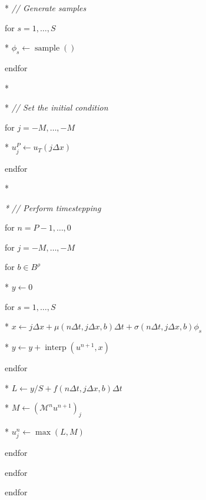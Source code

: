 \documentclass[12pt]{article}
\begin{document}
\medskip{}

{\footnotesize

\begin{multicols}{2}
\begin{algor}[1]
\item [{{*}}] \emph{// Generate samples}
\item [{for}] $s=1,\ldots,S$
\begin{algor}[1]
\item [{{*}}] $\phi_{s}\gets\operatorname{sample}()$
\end{algor}
\item [{endfor}]~
\item [{{*}}]~
\item [{{*}}] \emph{// Set the initial condition}
\item [{for}] $j=-M,\ldots,-M$
\begin{algor}[1]
\item [{{*}}] $u_{j}^{P}\gets u_{T}(j\Delta x)$
\end{algor}
\item [{endfor}]~
\item [{{*}}]~
\item [{\emph{{*}}}] \emph{// Perform timestepping}
\item [{for}] $n=P-1,\ldots,0$
\begin{algor}[1]
\item [{for}] $j=-M,\ldots,-M$
\begin{algor}[1]
\item [{for}] $b\in B^\rho$
\begin{algor}[1]
\item [{{*}}] $y\gets0$
\item [{for}] $s=1,\ldots,S$
\begin{algor}[1]
\item [{{*}}] $x\gets j\Delta x+\mu(n\Delta t,j\Delta x,b)\Delta t+\sigma(n\Delta t,j\Delta x,b)\phi_{s}$
\item [{{*}}] $y\gets y+{\operatorname{interp}}(u^{n+1},x)$
\end{algor}
\item [{endfor}]~
\item [{{*}}] $L \gets y/S+f(n\Delta t,j\Delta x,b)\Delta t$
\item [{{*}}] $M \gets (\mathcal{M}^{n}u^{n+1})_{j}$
\item [{{*}}] $u_{j}^{n}\gets\max(L,M)$
\end{algor}
\item [{endfor}]~
\end{algor}
\item [{endfor}]~
\end{algor}
\item [{endfor}]~
\end{algor}
\end{multicols}

}
\end{document}
